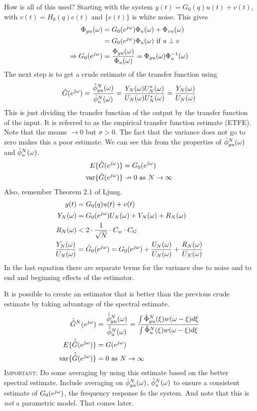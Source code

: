 How is all of this used? Starting with the system $y(t)=G_0(q)u(t)+v(t)$, with $v(t)=H_0(q)e(t)$ and $\{e(t)\}$ is white noise. This gives
\begin{align*}
\Phi_{yu}(\omega) &= G_0(e^{j\omega})\Phi_u(\omega) + \Phi_{vu}(\omega) \\
&= G_0(e^{j\omega})\Phi_u(\omega) \text{ if } u\perp v \\
\Rightarrow G_0(e^{j\omega}) &= \frac{\Phi_{yu}(\omega)}{\Phi_u(\omega)} = \Phi_{yu}(\omega)\Phi_u^{-1}(\omega)
\end{align*}
The next step is to get a crude estimate of the transfer function using
$$\hat{G}(e^{j\omega}) = \frac{\hat{\phi}_{yu}^N(\omega)}{\hat{\phi}_u^N(\omega)} = \frac{Y_N(\omega)U_N^*(\omega)}{U_N(\omega)U_N^*(\omega)} = \frac{Y_N(\omega)}{U_N(\omega)}$$
This is just dividing the transfer function of the output by the transfer function of the input. It is referred to as the empirical transfer function estimate (ETFE). Note that the means $\to 0$ but $\sigma>0$. The fact that the variance does not go to zero makes this a poor estimate. We can see this from the properties of $\hat{\phi}_{yu}^N(\omega)$ and $\hat{\phi}_u^N(\omega)$.
\begin{align*}
E\{\hat{G}(e^{j\omega})\} &= G_0(e^{j\omega}) \\
\text{var}\{\hat{G}(e^{j\omega})\} &\nrightarrow 0 \text{ as } N\to\infty
\end{align*}
Also, remember Theorem 2.1 of Ljung.
\begin{align*}
y(t) &= G_0(q)u(t) + v(t) \\
Y_N(\omega) &= G_0(e^{j\omega})U_N(\omega) + V_N(\omega) + R_N(\omega) \\
R_N(\omega) &< 2\cdot \frac{1}{\sqrt{N}}\cdot C_w\cdot C_G \\
\frac{Y_N(\omega)}{U_N(\omega)} &= \hat{G}_0(e^{j\omega}) = G_0(e^{j\omega}) + \frac{U_N(\omega)}{U_N(\omega)} + \frac{R_N(\omega)}{U_N(\omega)}
\end{align*}
In the last equation there are separate terms for the variance due to noise and to end and beginning effects of the estimator.

It is possible to create an estimator that is better than the previous crude estimate by taking advantage of the spectral estimate.
\begin{align*}
\hat{\hat{G}}^N(e^{j\omega}) &= \frac{\hat{\hat{\phi}}_{yu}^N(\omega)}{\hat{\hat{\phi}}_u^N(\omega)} = \frac{\int\hat{\Phi}_{yu}^N(\xi)w(\omega-\xi)d\xi}{\int \hat{\Phi}_u^N(\xi)w(\omega-\xi)d\xi} \\
E\{\hat{\hat{G}}(e^{j\omega})\} &= G(e^{j\omega}) \\
\text{var}\{\hat{\hat{G}}(e^{j\omega})\} &= 0 \text{ as } N\to\infty
\end{align*}
\textsc{Important:} Do some averaging by using this estimate based on the better spectral estimate. Include averaging on $\hat{\phi}_{yu}^N(\omega)$, $\hat{\phi}_u^N(\omega)$ to ensure a consistent estimate of $G_0(e^{j\omega})$, the frequency response fo the system. And note that this is \textit{not} a parametric model. That comes later.

